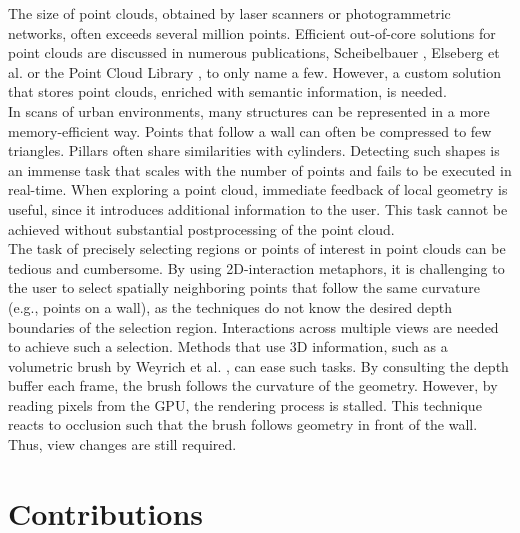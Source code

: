 The size of point clouds, obtained by laser scanners or photogrammetric networks, often exceeds several million points. 
Efficient out-of-core solutions for point clouds are discussed in numerous publications, Scheibelbauer \cite{scheiblauer-thesis}, Elseberg et al. \cite{elseberg2013one} or the Point Cloud Library \cite{rusu20113d}, to only name a few. However, a custom solution that stores point clouds, enriched with semantic information, is needed.
\\
In scans of urban environments, many structures can be represented in a more memory-efficient way. Points that follow a wall can often be compressed to few triangles. Pillars often share similarities with cylinders. Detecting such shapes is an immense task that scales with the number of points and fails to be executed in real-time. When exploring a point cloud, immediate feedback of local geometry is useful, since it introduces additional information to the user. This task cannot be achieved without substantial postprocessing of the point cloud. 
\\
The task of precisely selecting regions or points of interest in point clouds can be tedious and cumbersome. By using 2D-interaction metaphors, it is challenging to the user to select spatially neighboring points that follow the same curvature (e.g., points on a wall), as the techniques do not know the desired depth boundaries of the selection region. Interactions across multiple views are needed to achieve such a selection.  Methods that use 3D information, such as a volumetric brush by Weyrich et al. \cite{weyrich2004post}, can ease such tasks. By consulting the depth buffer each frame, the brush follows the curvature of the geometry. However, by reading pixels from the GPU, the rendering process is stalled. This technique reacts to occlusion such that the brush follows geometry in front of the wall. Thus, view changes are still required.


\section{Contributions}

